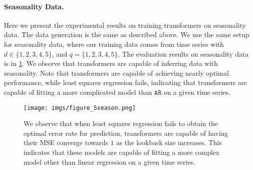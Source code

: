 \paragraph{Seasonality Data.}
Here we present the experimental results on training transformers on seasonality data.
The data generation is the same as described above.
We use the same setup for seasonality data, where our training data comes from time series with $d \in \{ 1, 2, 3, 4, 5 \}$, and $q = \{ 1, 2, 3, 4, 5\}$.
The evaluation results on seasonality data is in \cref{fig:seasonal}.
We observe that transformers are capable of inferring data with seasonality.
Note that transformers are capable of achieving nearly optimal performance, while least squares regression fails, indicating that transformers are capable of fitting a more complicated model than $\mathtt{AR}$ on a given time series.

\begin{figure}[h]
    \centering
    \texttt{[image: imgs/figure\_5season.png]}
    \caption{We observe that when least squares regression fails to obtain the optimal error rate for prediction, transformers are capable of having their MSE converge towards $1$ as the lookback size increases.
    This indicates that these models are capable of fitting a more complex model other than linear regression on a given time series.
    }
    \label{fig:seasonal}
\end{figure}


